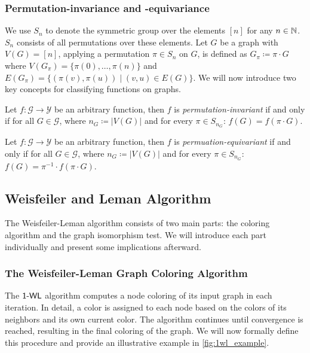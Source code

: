 \subsubsection{Permutation-invariance and -equivariance}
We use $S_n$ to denote the symmetric group over the elements $[n]$ for any $n \in \mathbb{N}$. $S_n$ consists of all permutations over these elements. Let $G$ be a graph with $V(G) = [n]$, applying a permutation $\pi \in S_n$ on $G$, is defined as $G_\pi \coloneqq \pi \cdot G$ where $V(G_\pi) = \{\pi(0), \ldots, \pi(n) \}$ and $E(G_\pi) = \{ (\pi(v), \pi(u)) \mid (v,u) \in E(G)\}$. We will now introduce two key concepts for classifying functions on graphs.

\begin{definition}
    Let $f: \mathcal{G} \rightarrow \mathcal{Y}$ be an arbitrary function, then $f$ is \textit{permutation-invariant} if and only if for all $G \in \mathcal{G}$, where $n_G \coloneqq |V(G)|$ and for every $\pi \in S_{n_G}$: $f(G) = f(\pi \cdot G)$.
\end{definition}

\begin{definition}
    Let $f: \mathcal{G} \rightarrow \mathcal{Y}$ be an arbitrary function, then $f$ is \textit{permuation-equivariant} if and only if for all $G \in \mathcal{G}$, where $n_G \coloneqq |V(G)|$ and for every $\pi \in S_{n_G}$: $f(G) = \pi^{-1} \cdot f(\pi \cdot G)$.
\end{definition}

\subsection{Weisfeiler and Leman Algorithm}\label{sec:1-WL Definition}
The Weisfeiler-Leman algorithm consists of two main parts: the coloring algorithm and the graph isomorphism test. We will introduce each part individually and present some implications afterward.

\subsubsection{The Weisfeiler-Leman Graph Coloring Algorithm}
The $\textsf{1-WL}$ algorithm computes a node coloring of its input graph in each iteration. In detail, a color is assigned to each node based on the colors of its neighbors and its own current color. The algorithm continues until convergence is reached, resulting in the final coloring of the graph. We will now formally define this procedure and provide an illustrative example in \cref{fig:1wl_example}.

